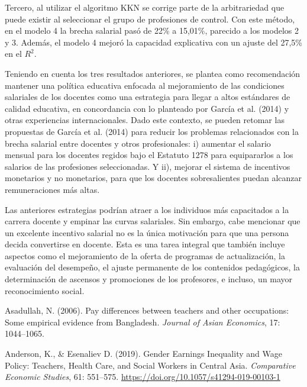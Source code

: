 \documentclass[a4paper]{article}
\begin{document}
Tercero, al utilizar el algoritmo KKN se corrige parte de la arbitrariedad que puede existir al seleccionar el grupo de profesiones de control. Con este método, en el modelo 4 la brecha salarial pasó de 22\% a 15,01\%, parecido a los modelos 2 y 3. Además, el modelo 4 mejoró la capacidad explicativa con un ajuste del 27,5\% en el $R^2$. 

Teniendo en cuenta los tres resultados anteriores, se plantea como recomendación mantener una política educativa enfocada al mejoramiento de las condiciones salariales de los docentes como una estrategia para llegar a altos estándares de calidad educativa, en concordancia con lo planteado por García et al. (2014) y otras experiencias internacionales. Dado este contexto, se pueden retomar las propuestas de García et al. (2014) para reducir los problemas relacionados con la brecha salarial entre docentes y otros profesionales: i) aumentar el salario mensual para los docentes regidos bajo el Estatuto 1278 para equipararlos a los salarios de las profesiones seleccionadas. Y ii), mejorar el sistema de incentivos monetarios y no monetarios, para que los docentes sobresalientes puedan alcanzar remuneraciones más altas. 

Las anteriores estrategias podrían atraer a los individuos más capacitados a la carrera docente y empinar las curvas salariales. Sin embargo, cabe mencionar que un excelente incentivo salarial no es la única motivación para que una persona decida convertirse en docente. Esta es una tarea integral que también incluye aspectos como el mejoramiento de la oferta de programas de actualización, la evaluación del desempeño, el ajuste permanente de los contenidos pedagógicos, la determinación de ascensos y promociones de los profesores, e incluso, un mayor reconocimiento social.

\newpage
{}
    \item Asadullah, N. (2006). Pay differences between teachers and other occupations: Some empirical evidence from Bangladesh. \textit{Journal of Asian Economics}, 17: 1044–1065. 
    
    \item Anderson, K., \& Esenaliev D. (2019). Gender Earnings Inequality and Wage Policy: Teachers, Health Care, and Social Workers in Central Asia. \textit{Comparative Economic Studies}, 61: 551–575.  \href{<url>}{https://doi.org/10.1057/s41294-019-00103-1}
    
\end{document}
